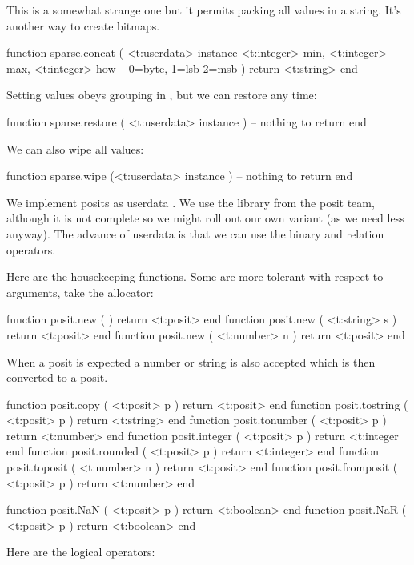 This is a somewhat strange one but it permits packing all values in a string.
It's another way to create bitmaps.

\starttyping[option=LUA]
function sparse.concat (
    <t:userdata> instance
    <t:integer>  min,
    <t:integer>  max,
    <t:integer>  how  -- 0=byte, 1=lsb 2=msb
)
    return <t:string>
end
\stoptyping

Setting values obeys grouping in \TEX, but we can restore any time:

\starttyping[option=LUA]
function sparse.restore ( <t:userdata> instance )
    -- nothing to return
end
\stoptyping

We can also wipe all values:

\starttyping[option=LUA]
function sparse.wipe (<t:userdata> instance )
    -- nothing to return
end
\stoptyping

\stopsubsection

\startsubsection[title=Posits]

We implement posits as userdata . We use the library from the posit team,
although it is not complete so we might roll out our own variant (as we need less
anyway). The advance of userdata is that we can use the binary and relation
operators.

Here are the housekeeping functions. Some are more tolerant with respect to
arguments, take the allocator:

\starttyping[option=LUA]
function posit.new (              ) return <t:posit> end
function posit.new ( <t:string> s ) return <t:posit> end
function posit.new ( <t:number> n ) return <t:posit> end
\stoptyping

When a posit is expected a number or string is also accepted which is then
converted to a posit.

\starttyping[option=LUA]
function posit.copy      ( <t:posit>  p ) return <t:posit>   end
function posit.tostring  ( <t:posit>  p ) return <t:string>  end
function posit.tonumber  ( <t:posit>  p ) return <t:number>  end
function posit.integer   ( <t:posit>  p ) return <t:integer  end
function posit.rounded   ( <t:posit>  p ) return <t:integer> end
function posit.toposit   ( <t:number> n ) return <t:posit>   end
function posit.fromposit ( <t:posit>  p ) return <t:number>  end
\stoptyping

\starttyping[option=LUA]
function posit.NaN ( <t:posit> p ) return <t:boolean> end
function posit.NaR ( <t:posit> p ) return <t:boolean> end
\stoptyping

Here are the logical operators:

